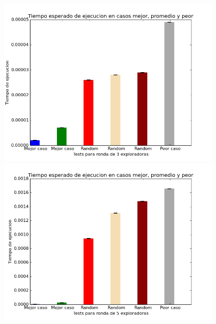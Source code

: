 \documentclass[spanish,a4paper]{article}
\begin{document}
      \begin{figure}[H]
        \includegraphics[scale=0.4]{tiemposE3}
        \includegraphics[scale=0.4]{tiemposE5}
      \end{figure}
\end{document}
